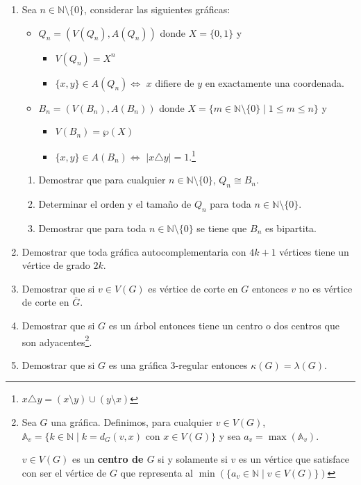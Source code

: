 \documentclass[11pt]{report}
\newcommand{\N}{\mathbb N}
\begin{document}
\begin{enumerate}
\item Sea $n \in \N \setminus \{0\}$, considerar las siguientes gráficas:
\begin{itemize}
\item $Q_n = (V(Q_n), A(Q_n))$ donde $X=\{0,1\}$ y
\begin{itemize}
\item $V(Q_n) = X^n $
\item $\{x,y\} \in A(Q_n) \Leftrightarrow$ $x$ difiere de $y$ en exactamente una coordenada. 
\end{itemize}

\item $B_n = (V(B_n), A(B_n))$ donde $X=\{m \in \N \setminus \{0\} \; | \; 1 \leq m \leq n\}$ y
\begin{itemize}
\item $V(B_n) = \wp(X) $
\item $\{x,y\} \in A(B_n) \Leftrightarrow$ $|x \triangle y|=1$.\footnote{$x \triangle y = (x \setminus y) \cup (y \setminus x)$}
\end{itemize}
\end{itemize}

\begin{enumerate}
\item Demostrar que para cualquier $n \in \N \setminus \{0\}$, $Q_n \cong B_n$.
\item Determinar el orden y el tamaño de $Q_n$ para toda $n \in \N \setminus \{0\}$.
\item Demostrar que para toda $n \in \N \setminus \{0\}$ se tiene que $B_n$ es bipartita.
\end{enumerate}

\item Demostrar que toda gráfica autocomplementaria con $4k+1$ vértices tiene un vértice de grado $2k$.

\item Demostrar que si $v \in V(G)$ es vértice de corte en $G$ entonces $v$ no es vértice de corte en $\overline{G}$.

\item Demostrar que si $G$ es un árbol entonces tiene un centro o dos centros que son adyacentes\footnote{Sea $G$ una gráfica. Definimos, para cualquier $v \in V(G)$, $\mathbb{A}_v = \{ k \in \mathbb N \; | \; k = d_G(v,x) \text{ con } x \in V(G)\}$ y sea $a_v = \max(\mathbb A_v)$.

$v \in V(G)$ es un \textbf{centro de $G$} si y solamente si $v$ es un vértice que satisface con ser el vértice de $G$ que representa al $\min(\{ a_v \in \mathbb N \; | \; v \in V(G) \})$}.

\item Demostrar que si $G$ es una gráfica $3$-regular entonces $\kappa(G) = \lambda(G)$.

\end{enumerate}
\end{document}
